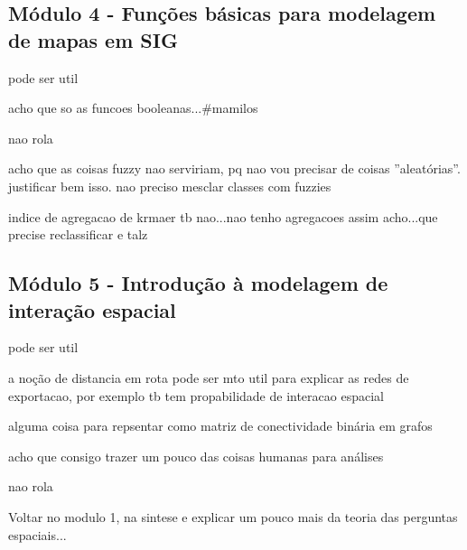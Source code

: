 


\subsection{Módulo 4 - Funções básicas para modelagem de mapas em SIG}

pode ser util

acho que so as funcoes booleanas...\#mamilos

nao rola

acho que as coisas fuzzy nao serviriam, pq nao vou precisar de coisas ''aleatórias''. justificar bem isso. nao preciso mesclar classes com fuzzies

indice de agregacao de krmaer tb nao...nao tenho agregacoes assim acho...que precise reclassificar e talz

\subsection{Módulo 5 - Introdução à modelagem de interação espacial}

pode ser util

a noção de distancia em rota pode ser mto util para explicar as redes de exportacao, por exemplo
tb tem propabilidade de interacao espacial

alguma coisa para repsentar como matriz de conectividade binária em grafos

acho que consigo trazer um pouco das coisas humanas para análises

nao rola


Voltar no modulo 1, na sintese e explicar um pouco mais da teoria das perguntas espaciais...
